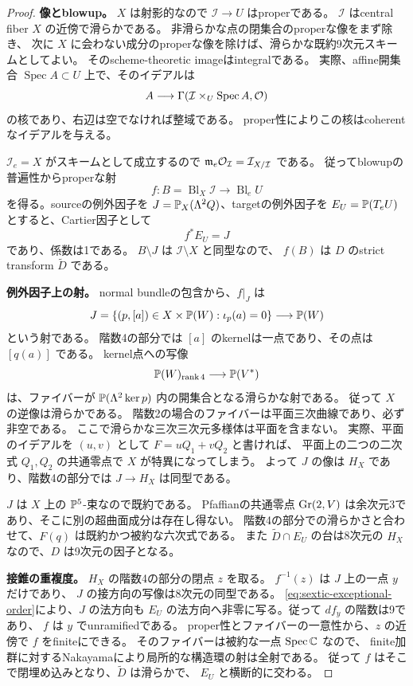 \begin{proof}
\textbf{像とblowup。}
$X$ は射影的なので $\mathcal I\to U$ はproperである。
$\mathcal I$ はcentral fiber $X$ の近傍で滑らかである。
非滑らかな点の閉集合のproperな像をまず除き、
次に $X$ に会わない成分のproperな像を除けば、滑らかな既約9次元スキームとしてよい。
そのscheme-theoretic imageはintegralである。
実際、affine開集合 $\operatorname{Spec}A\subset U$ 上で、そのイデアルは
\[
 A\longrightarrow\Gamma(\mathcal I\times_U\operatorname{Spec}A,\mathcal O)
\]
の核であり、右辺は空でなければ整域である。
proper性によりこの核はcoherentなイデアルを与える。

$\mathcal I_e=X$ がスキームとして成立するので
$\mathfrak m_e\mathcal O_{\mathcal I}=\mathcal I_{X/\mathcal I}$ である。
従ってblowupの普遍性からproperな射
\[
 f:B=\operatorname{Bl}_X\mathcal I\longrightarrow\operatorname{Bl}_eU
\]
を得る。sourceの例外因子を $J=\mathbb P_X(\Lambda^2Q)$、targetの例外因子を
$E_U=\mathbb P(T_eU)$ とすると、Cartier因子として
\begin{equation}\label{eq:sextic-exceptional-order}
                         f^*E_U=J
\end{equation}
であり、係数は1である。
$B\setminus J$ は $\mathcal I\setminus X$ と同型なので、
$f(B)$ は $D$ のstrict transform $\widetilde D$ である。

\textbf{例外因子上の射。}
normal bundleの包含から、$f|_J$ は
\[
 J=\{(p,[a])\in X\times\mathbb P(W):\iota_p(a)=0\}
   \longrightarrow\mathbb P(W)
\]
という射である。
階数4の部分では $[a]$ のkernelは一点であり、その点は $[q(a)]$ である。
kernel点への写像
\[
 \mathbb P(W)_{\operatorname{rank}4}\longrightarrow\mathbb P(V^*)
\]
は、ファイバーが $\mathbb P(\Lambda^2\ker p)$ 内の開集合となる滑らかな射である。
従って $X$ の逆像は滑らかである。
階数2の場合のファイバーは平面三次曲線であり、必ず非空である。
ここで滑らかな三次三次元多様体は平面を含まない。
実際、平面のイデアルを $(u,v)$ として $F=uQ_1+vQ_2$ と書ければ、
平面上の二つの二次式 $Q_1,Q_2$ の共通零点で $X$ が特異になってしまう。
よって $J$ の像は $H_X$ であり、階数4の部分では $J\to H_X$ は同型である。

$J$ は $X$ 上の $\mathbb P^5$-束なので既約である。
Pfaffianの共通零点 $\operatorname{Gr}(2,V)$ は余次元3であり、そこに別の超曲面成分は存在し得ない。
階数4の部分での滑らかさと合わせて、$F(q)$ は既約かつ被約な六次式である。
また $\widetilde D\cap E_U$ の台は8次元の $H_X$ なので、$D$ は9次元の因子となる。

\textbf{接錐の重複度。}
$H_X$ の階数4の部分の閉点 $z$ を取る。
$f^{-1}(z)$ は $J$ 上の一点 $y$ だけであり、
$J$ の接方向の写像は8次元の同型である。
\eqref{eq:sextic-exceptional-order}により、$J$ の法方向も
$E_U$ の法方向へ非零に写る。従って $df_y$ の階数は9であり、
$f$ は $y$ でunramifiedである。
proper性とファイバーの一意性から、$z$ の近傍で $f$ をfiniteにできる。
そのファイバーは被約な一点 $\operatorname{Spec}\mathbb C$ なので、
finite加群に対するNakayamaにより局所的な構造環の射は全射である。
従って $f$ はそこで閉埋め込みとなり、$\widetilde D$ は滑らかで、
$E_U$ と横断的に交わる。


\end{proof}

